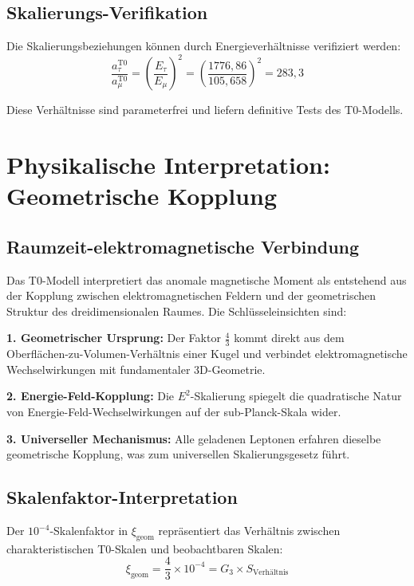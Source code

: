 \documentclass[12pt,a4paper]{report}
\newcommand{\xigeom}{\xi_{\text{geom}}}   %
\newcommand{\Emu}{E_\mu}                  %
\newcommand{\Etau}{E_\tau}                %
\begin{document}
\subsection{Skalierungs-Verifikation}
\label{subsec:scaling_verification}

Die Skalierungsbeziehungen können durch Energieverhältnisse verifiziert werden:
\begin{equation}
	\frac{a_\tau^{\text{T0}}}{a_\mu^{\text{T0}}} = \left(\frac{\Etau}{\Emu}\right)^2 = \left(\frac{1776,86}{105,658}\right)^2 = 283,3
	\label{eq:tau_muon_ratio}
\end{equation}

Diese Verhältnisse sind parameterfrei und liefern definitive Tests des T0-Modells.

\section{Physikalische Interpretation: Geometrische Kopplung}
\label{sec:physical_interpretation}

\subsection{Raumzeit-elektromagnetische Verbindung}
\label{subsec:spacetime_electromagnetic}

Das T0-Modell interpretiert das anomale magnetische Moment als entstehend aus der Kopplung zwischen elektromagnetischen Feldern und der geometrischen Struktur des dreidimensionalen Raumes. Die Schlüsseleinsichten sind:

\textbf{1. Geometrischer Ursprung:}
Der Faktor $\frac{4}{3}$ kommt direkt aus dem Oberflächen-zu-Volumen-Verhältnis einer Kugel und verbindet elektromagnetische Wechselwirkungen mit fundamentaler 3D-Geometrie.

\textbf{2. Energie-Feld-Kopplung:}
Die $E^2$-Skalierung spiegelt die quadratische Natur von Energie-Feld-Wechselwirkungen auf der sub-Planck-Skala wider.

\textbf{3. Universeller Mechanismus:}
Alle geladenen Leptonen erfahren dieselbe geometrische Kopplung, was zum universellen Skalierungsgesetz führt.

\subsection{Skalenfaktor-Interpretation}
\label{subsec:scale_factor}

Der $10^{-4}$-Skalenfaktor in $\xigeom$ repräsentiert das Verhältnis zwischen charakteristischen T0-Skalen und beobachtbaren Skalen:
\begin{equation}
	\xigeom = \frac{4}{3} \times 10^{-4} = G_3 \times S_{\text{Verhältnis}}
	\label{eq:scale_interpretation}
\end{equation}
\end{document}
